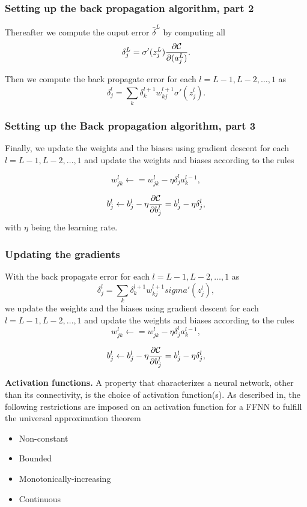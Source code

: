 \documentclass{beamer}
\begin{document}
\begin{frame}
\frametitle{Setting up the back propagation algorithm, part 2}

Thereafter we compute the ouput error $\hat{\delta}^L$ by computing all
\[
\delta_j^L = \sigma'(z_j^L)\frac{\partial {\cal C}}{\partial (a_j^L)}.
\]

Then we compute the back propagate error for each $l=L-1,L-2,\dots,1$ as
\[
\delta_j^l = \sum_k \delta_k^{l+1}w_{kj}^{l+1}\sigma'(z_j^l).
\]
\end{frame}

\begin{frame}
\frametitle{Setting up the Back propagation algorithm, part 3}

Finally, we update the weights and the biases using gradient descent
for each $l=L-1,L-2,\dots,1$ and update the weights and biases
according to the rules

\[
w_{jk}^l\leftarrow  = w_{jk}^l- \eta \delta_j^la_k^{l-1},
\]

\[
b_j^l \leftarrow b_j^l-\eta \frac{\partial {\cal C}}{\partial b_j^l}=b_j^l-\eta \delta_j^l,
\]
with $\eta$ being the learning rate.
\end{frame}

\begin{frame}
\frametitle{Updating the gradients}

With the back propagate error for each $l=L-1,L-2,\dots,1$ as
\[
\delta_j^l = \sum_k \delta_k^{l+1}w_{kj}^{l+1}sigma'(z_j^l),
\]
we update the weights and the biases using gradient descent for each $l=L-1,L-2,\dots,1$ and update the weights and biases according to the rules
\[
w_{jk}^l\leftarrow  = w_{jk}^l- \eta \delta_j^la_k^{l-1},
\]

\[
b_j^l \leftarrow b_j^l-\eta \frac{\partial {\cal C}}{\partial b_j^l}=b_j^l-\eta \delta_j^l,
\]
\end{frame}

\begin{frame}

\noindent\textbf{Activation functions.}
A property that characterizes a neural network, other than its
connectivity, is the choice of activation function(s).  As described
in, the following restrictions are imposed on an activation function
for a FFNN to fulfill the universal approximation theorem

\begin{itemize}
  \item Non-constant

  \item Bounded

  \item Monotonically-increasing

  \item Continuous
\end{itemize}

\noindent
\end{frame}
\end{document}
